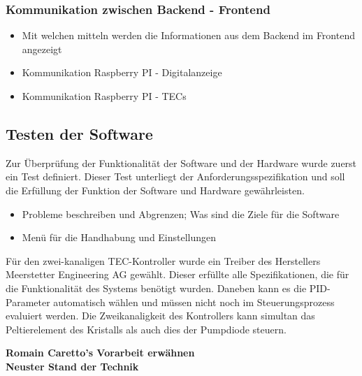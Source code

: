 \subsubsection{Kommunikation zwischen Backend - Frontend}

\begin{itemize}
    \item Mit welchen mitteln werden die Informationen aus dem Backend im Frontend angezeigt
    \item Kommunikation Raspberry PI - Digitalanzeige
    \item Kommunikation Raspberry PI - TECs
\end{itemize}


\subsection{Testen der Software}
Zur Überprüfung der Funktionalität der Software und der Hardware wurde zuerst ein Test definiert. Dieser Test unterliegt der Anforderungsspezifikation und soll die Erfüllung der Funktion der Software und Hardware gewährleisten.

\begin{itemize}
    \item Probleme beschreiben und Abgrenzen; Was sind die Ziele für die Software
    \item Menü für die Handhabung und Einstellungen
\end{itemize}

Für den zwei-kanaligen TEC-Kontroller wurde ein Treiber des Herstellers Meerstetter Engineering AG gewählt. Dieser erfüllte alle Spezifikationen, die für die Funktionalität des Systems benötigt wurden. Daneben kann es die PID-Parameter automatisch wählen und müssen nicht noch im Steuerungsprozess evaluiert werden. Die Zweikanaligkeit des Kontrollers kann simultan das Peltierelement des Kristalls als auch dies der Pumpdiode steuern.

\textbf{Romain Caretto's Vorarbeit erwähnen}\\
\textbf{Neuster Stand der Technik}

\nocite{*}

